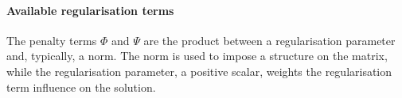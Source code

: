 \paragraph*{Available regularisation terms}\label{penaltiessec}

The penalty terms $\Phi$ and $\Psi$ are the product between a regularisation parameter and, typically, a norm. The norm is used to impose a structure on the matrix, while the regularisation parameter, a positive scalar, weights the regularisation term influence on the solution.%


